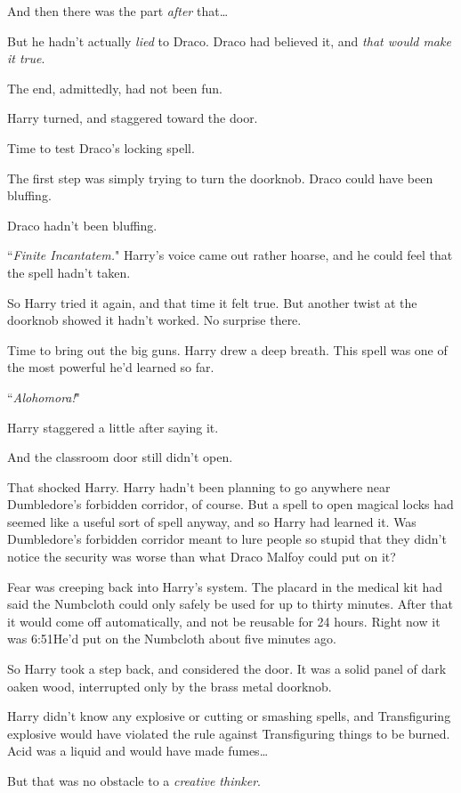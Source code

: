 And then there was the part \emph{after} that{\ldots}

But he hadn't actually \emph{lied} to Draco. Draco had believed it, and \emph{that would make it true}.

The end, admittedly, had not been fun.

Harry turned, and staggered toward the door.

Time to test Draco's locking spell.

The first step was simply trying to turn the doorknob. Draco could have been bluffing.

Draco hadn't been bluffing.

``\emph{Finite Incantatem.}" Harry's voice came out rather hoarse, and he could feel that the spell hadn't taken.

So Harry tried it again, and that time it felt true. But another twist at the doorknob showed it hadn't worked. No surprise there.

Time to bring out the big guns. Harry drew a deep breath. This spell was one of the most powerful he'd learned so far.

``\emph{Alohomora!}"

Harry staggered a little after saying it.

And the classroom door still didn't open.

That shocked Harry. Harry hadn't been planning to go anywhere near Dumbledore's forbidden corridor, of course. But a spell to open magical locks had seemed like a useful sort of spell anyway, and so Harry had learned it. Was Dumbledore's forbidden corridor meant to lure people so stupid that they didn't notice the security was worse than what Draco Malfoy could put on it?

Fear was creeping back into Harry's system. The placard in the medical kit had said the Numbcloth could only safely be used for up to thirty minutes. After that it would come off automatically, and not be reusable for 24 hours. Right now it was 6:51\pm He'd put on the Numbcloth about five minutes ago.

So Harry took a step back, and considered the door. It was a solid panel of dark oaken wood, interrupted only by the brass metal doorknob.

Harry didn't know any explosive or cutting or smashing spells, and Transfiguring explosive would have violated the rule against Transfiguring things to be burned. Acid was a liquid and would have made fumes{\ldots}

But that was no obstacle to a \emph{creative thinker}.


